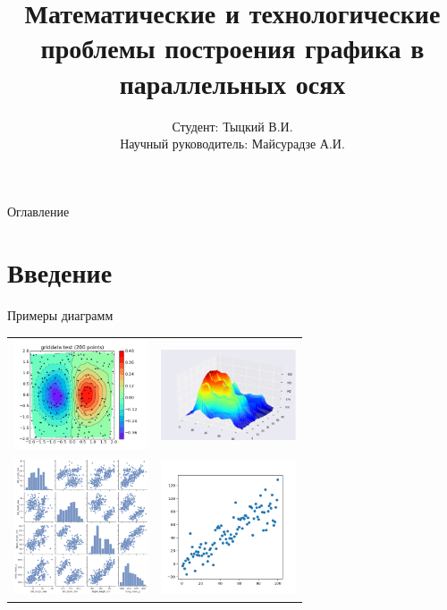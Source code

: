\documentclass[fleqn, xcolor=x11names]{beamer}
\title{\bfseries Математические и технологические проблемы построения графика в параллельных осях}
\author[Тыцкий В.И.]{Студент: Тыцкий В.И.\\[1ex]  {\small Научный руководитель: Майсурадзе А.И.}}
\institute[ВМК МГУ]{МГУ имени М. В. Ломоносова, факультет ВМК, кафедра ММП}
\date{}
\begin{document}
\begin{frame}
    \titlepage
\end{frame}

 \begin{frame}{Оглавление}
     \tableofcontents
\end{frame}

\section{Введение}

\begin{frame}{Примеры диаграмм}
    \centering
    \begin{tabular}{cc}
        \includegraphics[width=4cm]{example_3.png} &
        \includegraphics[width=4cm]{example_2.png}   \\
        \includegraphics[width=4cm]{pairplot.png} &
        \includegraphics[width=4cm]{example_4.png}
    \end{tabular}
\end{frame}
\end{document}
